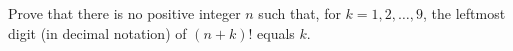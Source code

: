 Prove that there is no positive integer $n$ such that, for $k=1,2,\ldots,9$, the leftmost digit (in decimal notation) of $\left(n+k\right)!$ equals $k$.